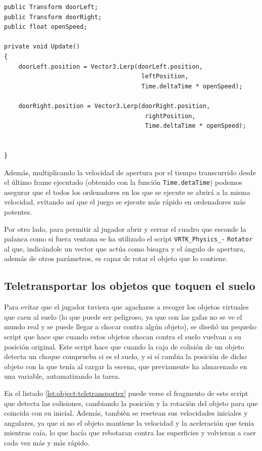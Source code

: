 \begin{lstlisting}[caption=Fragmento del script para abrir y cerrar una puerta abatible con una palanca, label=lst:lever-controller]
public Transform doorLeft;
public Transform doorRight;
public float openSpeed;

private void Update()
{
    doorLeft.position = Vector3.Lerp(doorLeft.position,
                                      leftPosition,
                                      Time.deltaTime * openSpeed);
    
    doorRight.position = Vector3.Lerp(doorRight.position,
                                       rightPosition,
                                       Time.deltaTime * openSpeed);
    

}
\end{lstlisting}

Además, multiplicando la velocidad de apertura por el tiempo transcurrido desde el último frame ejecutado (obtenido con la función \texttt{Time.detaTime}) podemos asegurar que el todos los ordenadores en los que se ejecute se abrirá a la misma velocidad, evitando así que el juego se ejecute más rápido en ordenadores más potentes.

Por otro lado, para permitir al jugador abrir y cerrar el cuadro que esconde la palanca como si fuera ventana se ha utilizado el script \texttt{VRTK\_Physics\_-} \texttt{Rotator} al que, indicándole un vector que actúa como bisagra y el ángulo de apertura, además de otros parámetros, es capaz de rotar el objeto que lo contiene.

\subsection{Teletransportar los objetos que toquen el suelo}

Para evitar que el jugador tuviera que agacharse a recoger los objetos virtuales que caen al suelo (lo que puede ser peligroso, ya que con las gafas no se ve el mundo real y se puede llegar a chocar contra algún objeto), se diseñó un pequeño script que hace que cuando estos objetos chocan contra el suelo vuelvan a su posición original. Este script hace que cuando la caja de colisión de un objeto detecta un choque comprueba si es el suelo, y si sí cambia la posición de dicho objeto con la que tenía al cargar la escena, que previamente ha almacenado en una variable, automatizando la tarea.

En el listado \ref{lst:object-teletransporter} puede verse el fragmento de este script que detecta las colisiones, cambiando la posición y la rotación del objeto para que coincida con su inicial. Además, también se resetean sus velocidades iniciales y angulares, ya que si no el objeto mantiene la velocidad y la aceleración que tenía mientras caía, lo que hacía que rebotaran contra las superficies y volvieran a caer cada vez más y más rápido.

